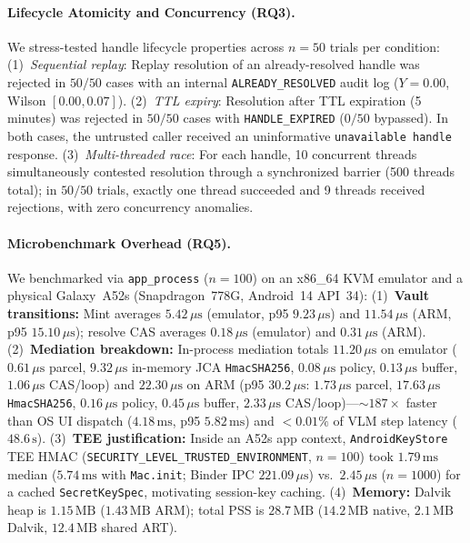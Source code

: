 \paragraph{Lifecycle Atomicity and Concurrency (RQ3).}
We stress-tested handle lifecycle properties across $n=50$ trials per condition: (1)~\emph{Sequential replay}: Replay resolution of an already-resolved handle was rejected in $50/50$ cases with an internal \texttt{ALREADY\_RESOLVED} audit log ($Y=0.00$, Wilson $[0.00, 0.07]$). (2)~\emph{TTL expiry}: Resolution after TTL expiration (5 minutes) was rejected in $50/50$ cases with \texttt{HANDLE\_EXPIRED} ($0/50$ bypassed). In both cases, the untrusted caller received an uninformative \texttt{unavailable handle} response. (3)~\emph{Multi-threaded race}: For each handle, 10 concurrent threads simultaneously contested resolution through a synchronized barrier (500 threads total); in $50/50$ trials, exactly one thread succeeded and 9 threads received rejections, with zero concurrency anomalies.

\paragraph{Microbenchmark Overhead (RQ5).}
We benchmarked \SH{} via \texttt{app\_process} ($n=100$) on an x86\_64 KVM emulator and a physical Galaxy~A52s (Snapdragon~778G, Android~14 API~34): (1)~\textbf{Vault transitions:} Mint averages $5.42\,\mu\text{s}$ (emulator, p95 $9.23\,\mu\text{s}$) and $11.54\,\mu\text{s}$ (ARM, p95 $15.10\,\mu\text{s}$); resolve CAS averages $0.18\,\mu\text{s}$ (emulator) and $0.31\,\mu\text{s}$ (ARM). (2)~\textbf{Mediation breakdown:} In-process mediation totals $11.20\,\mu\text{s}$ on emulator ($0.61\,\mu\text{s}$ parcel, $9.32\,\mu\text{s}$ in-memory JCA \texttt{HmacSHA256}, $0.08\,\mu\text{s}$ policy, $0.13\,\mu\text{s}$ buffer, $1.06\,\mu\text{s}$ CAS/loop) and $22.30\,\mu\text{s}$ on ARM (p95 $30.2\,\mu\text{s}$: $1.73\,\mu\text{s}$ parcel, $17.63\,\mu\text{s}$ \texttt{HmacSHA256}, $0.16\,\mu\text{s}$ policy, $0.45\,\mu\text{s}$ buffer, $2.33\,\mu\text{s}$ CAS/loop)---$\sim 187\times$ faster than OS UI dispatch ($4.18\,\text{ms}$, p95 $5.82\,\text{ms}$) and $<0.01\%$ of VLM step latency ($48.6\,\text{s}$). (3)~\textbf{TEE justification:} Inside an A52s app context, \texttt{AndroidKeyStore} TEE HMAC (\texttt{SECURITY\_LEVEL\_TRUSTED\_ENVIRONMENT}, $n=100$) took $1.79\,\text{ms}$ median ($5.74\,\text{ms}$ with \texttt{Mac.init}; Binder IPC $221.09\,\mu\text{s}$) vs.\ $2.45\,\mu\text{s}$ ($n=1000$) for a cached \texttt{SecretKeySpec}, motivating session-key caching. (4)~\textbf{Memory:} Dalvik heap is $1.15\,\text{MB}$ ($1.43\,\text{MB}$ ARM); total PSS is $28.7\,\text{MB}$ ($14.2\,\text{MB}$ native, $2.1\,\text{MB}$ Dalvik, $12.4\,\text{MB}$ shared ART).

